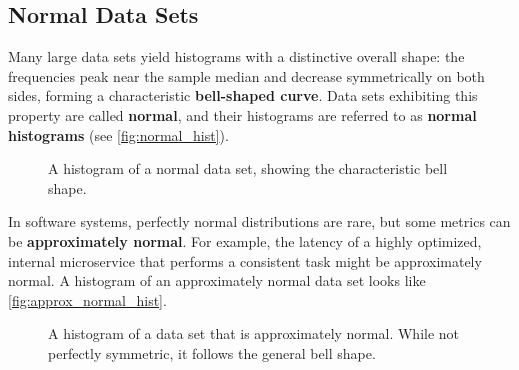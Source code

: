 \subsection*{Normal Data Sets}

Many large data sets yield histograms with a distinctive overall shape: the frequencies peak near the sample median and decrease symmetrically on both sides, forming a characteristic \textbf{bell-shaped curve}. Data sets exhibiting this property are called \textbf{normal}, and their histograms are referred to as \textbf{normal histograms} (see \autoref{fig:normal_hist}).

\begin{figure}[htbp]
    \centering
    \caption{A histogram of a normal data set, showing the characteristic bell shape.}
    \label{fig:normal_hist}
\end{figure}


In software systems, perfectly normal distributions are rare, but some metrics can be \textbf{approximately normal}. For example, the latency of a highly optimized, internal microservice that performs a consistent task might be approximately normal. A histogram of an approximately normal data set looks like \autoref{fig:approx_normal_hist}.

\begin{figure}[htbp]
    \centering
    \caption{A histogram of a data set that is approximately normal. While not perfectly symmetric, it follows the general bell shape.}
    \label{fig:approx_normal_hist}
\end{figure}

